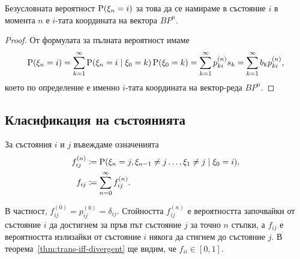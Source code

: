 \documentclass[numbers=endperiod, bibliography=totocnumbered]{scrartcl}
\begin{document}
\begin{corollary}
  Безусловната вероятност \( \operatorname{P}(\xi_n = i) \) за това да се намираме в състояние \( i \) в момента \( n \) е \( i \)-тата координата на вектора \( B P^n \).
\end{corollary}
\begin{proof}
  От формулата за пълната вероятност имаме
  \begin{align*}
    \operatorname{P}(\xi_n = i)
    =
    \sum_{k=1}^\infty \operatorname{P}(\xi_n = i \mid \xi_0 = k) \operatorname{P}(\xi_0 = k)
    =
    \sum_{k=1}^\infty p^{(n)}_{ki} s_k
    =
    \sum_{k=1}^\infty b_k p^{(n)}_{ki},
  \end{align*}
  което по определение е именно \( i \)-тата координата на вектор-реда \( B P^n \).
\end{proof}

\subsection{Класификация на състоянията}

За състояния \( i \) и \( j \) въвеждаме означенията
\begin{align*}
  f_{ij}^{(n)} &\coloneqq \operatorname{P}(\xi_n = j, \xi_{n-1} \neq j \ldots, \xi_1 \neq j \mid \xi_0 = i), \\
  f_{ij} &\coloneqq \sum_{n=0}^\infty f_{ij}^{(n)}.
\end{align*}

В частност, \( f_{ij}^{(0)} = p_{ij}^{(0)} = \delta_{ij} \). Стойността \( f^{(n)}_{ij} \) е вероятността започвайки от състояние \( i \) да достигнем за пръв път състояние \( j \) за точно \( n \) стъпки, а \( f_{ij} \) е вероятността излизайки от състояние \( i \) някога да стигнем до състояние \( j \).  В теорема~\ref{thm:trans-iff-divergent} ще видим, че \( f_{ii} \in [0, 1] \).
\end{document}
